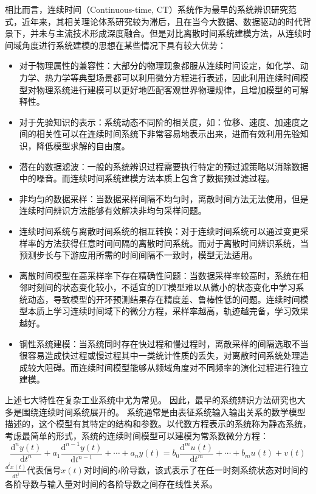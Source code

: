 相比而言，连续时间（Continuous-time, CT）系统作为最早的系统辨识研究范式，近年来，其相关理论体系研究较为滞后，且在当今大数据、数据驱动的时代背景下，并未与主流技术形成深度融合。但是对比离散时间系统建模方法，从连续时间域角度进行系统建模的思想在某些情况下具有较大优势：
\begin{itemize}
\item	对于物理属性的兼容性：大部分的物理现象都服从连续时间设定，如化学、动力学、热力学等典型场景都可以利用微分方程进行表述，因此利用连续时间模型对物理系统进行建模可以更好地匹配客观世界物理规律，且增加模型的可解释性。
\item	对于先验知识的表示：系统动态不同阶的相关度，如：位移、速度、加速度之间的相关性可以在连续时间系统下非常容易地表示出来，进而有效利用先验知识，降低模型求解的自由度。
\item 潜在的数据滤波：一般的系统辨识过程需要执行特定的预过滤策略以消除数据中的噪音。而连续时间系统建模方法本质上包含了数据预过滤过程。
\item	非均匀的数据采样：当数据采样间隔不均匀时，离散时间方法无法使用，但是连续时间辨识方法能够有效解决非均匀采样问题。
\item	连续时间系统与离散时间系统的相互转换：对于连续时间系统可以通过变更采样率的方法获得任意时间间隔的离散时间系统。而对于离散时间辨识系统，当预测步长与下游应用所需的时间间隔不一致时，模型无法适用。
\item	离散时间模型在高采样率下存在精确性问题：当数据采样率较高时，系统在相邻时刻间的状态变化较小，不适宜的DT模型难以从微小的状态变化中学习系统动态，导致模型的开环预测结果存在精度差、鲁棒性低的问题。连续时间模型本质上学习连续时间域下的微分方程，采样率越高，轨迹越完备，学习效果越好。
\item	钢性系统建模：当系统同时存在快过程和慢过程时，离散采样的间隔选取不当很容易造成快过程或慢过程其中一类统计性质的丢失，对离散时间系统处理造成较大阻碍。而连续时间模型能够从频域角度对不同频率的演化过程进行独立建模。
\end{itemize}
上述七大特性在复杂工业系统中尤为常见。
因此，最早的系统辨识方法研究也大多是围绕连续时间系统展开的。
系统通常是由表征系统输入输出关系的数学模型描述的，这个模型有其特定的结构和参数。以代数方程表示的系统称为静态系统，
考虑最简单的形式，系统的连续时间模型可以建模为常系数微分方程：
\begin{equation}
\frac{\mathrm{d}^{n} y(t)}{\mathrm{d} t^{n}}+a_{1} \frac{\mathrm{d}^{n-1} y(t)}{\mathrm{d} t^{n-1}}+\cdots+a_{n} y(t)=b_{0} \frac{\mathrm{d}^{m} u(t)}{\mathrm{d} t^{m}}+\cdots+b_{m} u(t)+v(t)
\end{equation}
$\frac{d^{i} x(t)}{d t^{i}}$代表信号$x(t)$对时间的$i$阶导数，该式表示了在任一时刻系统状态对时间的各阶导数与输入量对时间的各阶导数之间存在线性关系。

